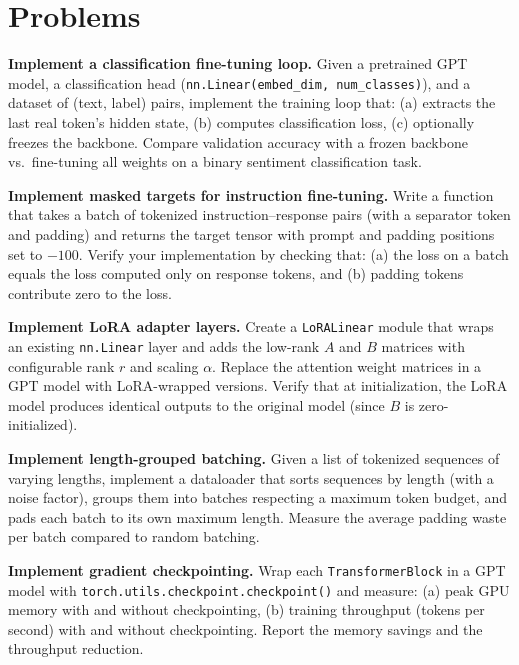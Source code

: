 \section*{Problems}

\begin{problem}[1]
  \textbf{Implement a classification fine-tuning loop.} Given a
  pretrained GPT model, a classification head
  (\texttt{nn.Linear(embed\_dim, num\_classes)}), and a dataset of
  (text, label) pairs, implement the training loop that:
  (a) extracts the last real token's hidden state, (b) computes
  classification loss, (c) optionally freezes the backbone. Compare
  validation accuracy with a frozen backbone vs.\ fine-tuning all
  weights on a binary sentiment classification task.
\end{problem}

\begin{problem}[2]
  \textbf{Implement masked targets for instruction fine-tuning.}
  Write a function that takes a batch of tokenized instruction--response
  pairs (with a separator token and padding) and returns the target
  tensor with prompt and padding positions set to $-100$. Verify your
  implementation by checking that: (a) the loss on a batch equals the
  loss computed only on response tokens, and (b) padding tokens
  contribute zero to the loss.
\end{problem}

\begin{problem}[3]
  \textbf{Implement LoRA adapter layers.} Create a
  \texttt{LoRALinear} module that wraps an existing \texttt{nn.Linear}
  layer and adds the low-rank $A$ and $B$ matrices with configurable
  rank $r$ and scaling $\alpha$. Replace the attention weight matrices
  in a GPT model with LoRA-wrapped versions. Verify that at
  initialization, the LoRA model produces identical outputs to the
  original model (since $B$ is zero-initialized).
\end{problem}

\begin{problem}[4]
  \textbf{Implement length-grouped batching.} Given a list of
  tokenized sequences of varying lengths, implement a dataloader that
  sorts sequences by length (with a noise factor), groups them into
  batches respecting a maximum token budget, and pads each batch to its
  own maximum length. Measure the average padding waste per batch
  compared to random batching.
\end{problem}

\begin{problem}[5]
  \textbf{Implement gradient checkpointing.} Wrap each
  \texttt{TransformerBlock} in a GPT model with
  \texttt{torch.utils.checkpoint.checkpoint()} and measure: (a) peak
  GPU memory with and without checkpointing, (b) training throughput
  (tokens per second) with and without checkpointing. Report the
  memory savings and the throughput reduction.
\end{problem}